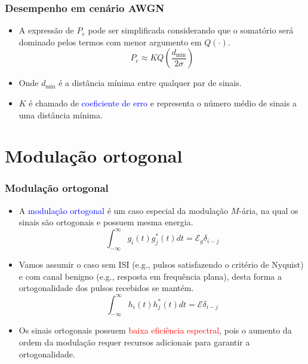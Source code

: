 \begin{frame}
	\frametitle{Desempenho em cenário AWGN}

	\begin{itemize}
	    \item A expressão de $P_e$ pode ser simplificada considerando que o somatório será dominado pelos termos com menor argumento em $Q(\cdot)$.
	    \begin{equation*}
		P_e \approx K Q\left(\frac{d_{\min}}{2\sigma} \right)
	    \end{equation*}
	    \item Onde $d_{\min}$ é a distância mínima entre qualquer par de sinais.
	    \item $K$ é chamado de \textcolor{blue}{coeficiente de erro} e representa o número médio de sinais a uma distância mínima.
	\end{itemize}
\end{frame}

\section{Modulação ortogonal}

\begin{frame}
	\frametitle{Modulação ortogonal}

	\begin{itemize}
	    \item A \textcolor{blue}{modulação ortogonal} é um caso especial da modulação $M$-ária, na qual os sinais são ortogonais e possuem mesma energia.
	    \begin{equation*}
		\int_{-\infty}^{\infty} g_i(t)g_j^*(t) dt = \mathcal{E}_g \delta_{i-j}
	    \end{equation*}
	    \item Vamos assumir o caso sem ISI (e.g., pulsos satisfazendo o critério de Nyquist) e com canal benigno (e.g., resposta em frequência plana), desta forma a ortogonalidade dos pulsos recebidos se mantém.
	    \begin{equation*}
		\int_{-\infty}^{\infty} h_i(t)h_j^*(t) dt = \mathcal{E} \delta_{i-j}
	    \end{equation*}
	    \item Os sinais ortogonais possuem \textcolor{red}{baixa eficiência espectral}, pois o aumento da ordem da modulação requer recursos adicionais para garantir a ortogonalidade.
	\end{itemize}
\end{frame}

